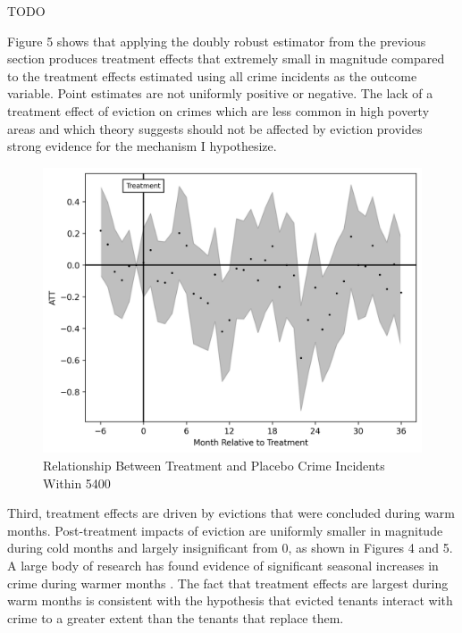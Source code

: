 \documentclass[12pt]{article}
\begin{document}
\begin{landscape}
    
    \begin{table}[H]
        \centering
        
        \caption{TODO}
        \label{tab:my_label}
    \end{table}
    \end{landscape}


    Figure 5 shows that applying the doubly robust estimator from the previous section produces treatment effects that extremely small in magnitude compared to the treatment effects estimated using all crime incidents as the outcome variable. Point estimates are not uniformly positive or negative. The lack of a treatment effect of eviction on crimes which are less common in high poverty areas and which theory suggests should not be affected by eviction provides strong evidence for the mechanism I hypothesize. 

    \begin{figure}[H]
        \centering
        \includegraphics{output/group_1_crimes_500m/figures/att_gt_dr_event_study_long_horizon.png}
        \caption{Relationship Between Treatment and Placebo Crime Incidents Within 5400}
        \label{fig:my_label}
    \end{figure}
    
    


    Third, treatment effects are driven by evictions that were concluded during warm months. Post-treatment impacts of eviction are uniformly smaller in magnitude during cold months and largely insignificant from 0, as shown in Figures 4 and 5. A large body of research has found evidence of significant seasonal increases in crime during warmer months \citep{lauritsen_seasonal_2014}. The fact that treatment effects are largest during warm months is consistent with the hypothesis that evicted tenants interact with crime to a greater extent than the tenants that replace them. 
\end{document}
